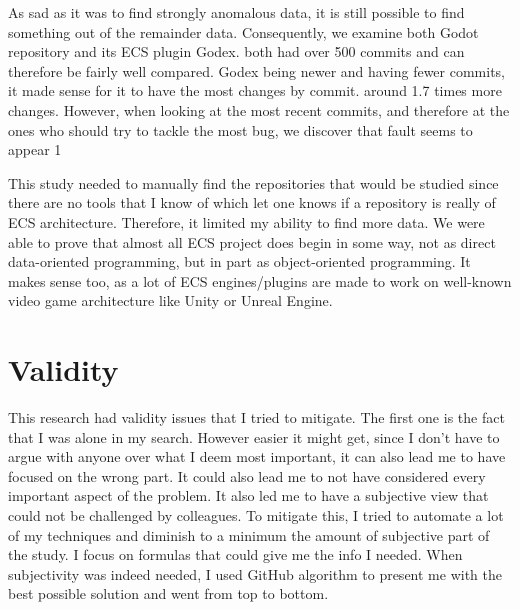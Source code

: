 \documentclass{IEEEcsmag}
\begin{document}
As sad as it was to find strongly anomalous data, it is still possible to find something out of the remainder data. Consequently, we examine both Godot repository and its ECS plugin Godex. both had over 500 commits and can therefore be fairly well compared. Godex being newer and having fewer commits, it made sense for it to have the most changes by commit. around 1.7 times more changes. However, when looking at the most recent commits, and therefore at the ones who should try to tackle the most bug, we discover that fault seems to appear 1%

This study needed to manually find the repositories that would be studied since there are no tools that I know of which let one knows if a repository is really of ECS architecture. Therefore, it limited my ability to find more data. We were able to prove that almost all ECS project does begin in some way, not as direct data-oriented programming, but in part as object-oriented programming. It makes sense too, as a lot of ECS engines/plugins are made to work on well-known video game architecture like Unity or Unreal Engine. 

\section{Validity}

This research had validity issues that I tried to mitigate. The first one is the fact that I was alone in my search. However easier it might get, since I don't have to argue with anyone over what I deem most important, it can also lead me to have focused on the wrong part.  It could also lead me to not have considered every important aspect of the problem. It also led me to have a subjective view that could not be challenged by colleagues. To mitigate this, I tried to automate a lot of my techniques and diminish to a minimum the amount of subjective part of the study. I focus on formulas that could give me the info I needed. When subjectivity was indeed needed, I used GitHub algorithm to present me with the best possible solution and went from top to bottom.    
\end{document}
